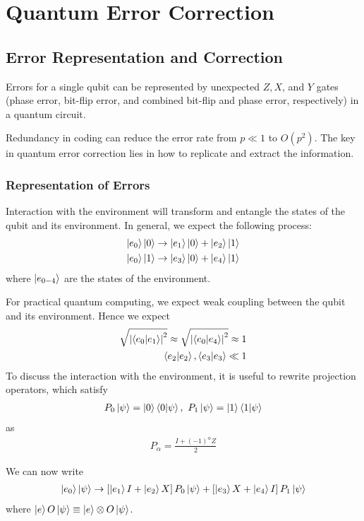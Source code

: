 \newpage
\section{Quantum Error Correction}

\subsection{Error Representation and Correction}
Errors for a single qubit can be represented by unexpected $Z, X$, and $Y$ gates (phase error, bit-flip error, and combined bit-flip and phase error, respectively) in a quantum circuit.

Redundancy in coding can reduce the error rate from $p\ll 1$ to $O(p^2)$. The key in quantum error correction lies in how to replicate and extract the information.

\subsubsection{Representation of Errors}
Interaction with the environment will transform and entangle the states of the qubit and its environment. In general, we expect the following process:
\begin{align*}
    \ket{e_0}\ket{0}&\rightarrow \ket{e_1}\ket{0}+\ket{e_2}\ket{1}\\
    \ket{e_0}\ket{1}&\rightarrow \ket{e_3}\ket{0}+\ket{e_4}\ket{1}
\end{align*}
where $\ket{e_{0-4}}$ are the states of the environment. 

For practical quantum computing, we expect weak coupling between the qubit and its environment. Hence we expect
\begin{align*}
    \sqrt{\left|\braket{e_0|e_1}\right|^2}\approx \sqrt{\left|\braket{e_0|e_4}\right|^2}\approx 1\\
    \braket{e_2|e_2}, \braket{e_3|e_3}\ll 1
\end{align*}
To discuss the interaction with the environment, it is useful to rewrite projection operators, which satisfy
\begin{align*}
    P_0\ket{\psi}=\ket{0}\braket{0|\psi},\ P_1\ket{\psi}=\ket{1}\braket{1|\psi}
\end{align*}
as
\begin{align*}
    P_\alpha=\frac{I+(-1)^\alpha Z}{2}
\end{align*}

We can now write
\begin{align*}
    \ket{e_0}\ket{\psi}\rightarrow\left[ \ket{e_1}I+\ket{e_2}X \right]P_0\ket{\psi}+\left[ \ket{e_3}X+\ket{e_4}I \right]P_1\ket{\psi}
\end{align*}
where $\ket{e}O\ket{\psi}\equiv \ket{e}\otimes O\ket{\psi}$. 

